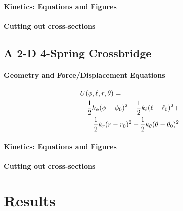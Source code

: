 \documentclass[11pt]{article}
\begin{document}
\begin{multicols}{2}
\paragraph*{Kinetics: Equations and Figures}

\paragraph*{Cutting out cross-sections}

\subsection*{A 2-D 4-Spring Crossbridge}

\paragraph*{Geometry and Force/Displacement Equations}

\begin{eqnarray}
	\lefteqn{U(\phi,\ell,r,\theta) = }  \nonumber \\
 	& & \frac{1}{2}k_\phi (\phi-\phi_0)^2 + \frac{1}{2}k_\ell (\ell-\ell_0)^2 + \nonumber \\
	& & \frac{1}{2}k_r (r-r_0)^2 + \frac{1}{2}k_\theta (\theta-\theta_0)^2
\end{eqnarray}

\paragraph*{Kinetics: Equations and Figures}
\paragraph*{Cutting out cross-sections}


\section*{Results}




\end{multicols}
\end{document}
